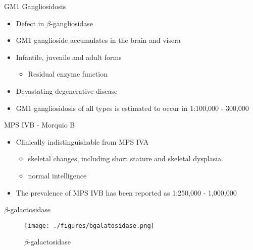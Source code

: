 \documentclass[presentation, smaller]{beamer}
\begin{document}
\begin{frame}[label={sec:orgheadline2}]{GM1 Gangliosidosis}
\begin{itemize}
\item Defect in \(\beta\)-gangliosidase
\item GM1 ganglioside accumulates in the brain and visera
\item Infantile, juvenile and adult forms
\begin{itemize}
\item Residual enzyme function
\end{itemize}
\item Devastating degenerative disease
\item GM1 gangliosidosis of all types is estimated to occur in 1:100,000 - 300,000
\end{itemize}

\begin{block}{MPS IVB - Morquio B}
\begin{itemize}
\item Clinically indistinguishable from MPS IVA
\begin{itemize}
\item skeletal changes, including short stature and skeletal dysplasia.
\item normal intelligence
\end{itemize}
\item The prevalence of MPS IVB has been reported as 1:250,000 - 1,000,000
\end{itemize}
\end{block}
\end{frame}


\begin{frame}[label={sec:orgheadline3}]{\(\beta\)-galactosidase}
\begin{figure}[htb]
\centering
\texttt{[image: ./figures/bgalatosidase.png]}
\caption[bgal]{\label{fig:bgal}
\(\beta\)-galactosidase}
\end{figure}
\end{frame}
\end{document}

